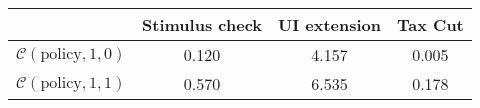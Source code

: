 \begin{tabular}{@{}lccc@{}} 
\toprule 
                          & Stimulus check      & UI extension   & Tax Cut    \\  \midrule 
$\mathcal{C}(\text{policy},1,0)$ & 0.120  & 4.157  & 0.005     \\ 
$\mathcal{C}(\text{policy},1,1)$ & 0.570  & 6.535  & 0.178     \\ 
\end{tabular}  
